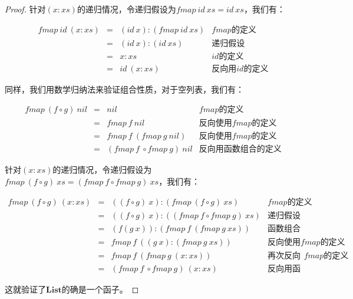 \documentclass{article}
\begin{document}
\begin{example}
\begin{proof}
针对$(x:xs)$的递归情况，令递归假设为$fmap\ id\ xs = id\ xs$，我们有：

\[
\begin{array}{rcll}
fmap\ id\ (x:xs) & = & (id\ x):(fmap\ id\ xs) & \text{$fmap$的定义} \\
                 & = & (id\ x):(id\ xs) & \text{递归假设} \\
                 & = & x:xs & \text{$id$的定义} \\
                 & = & id\ (x:xs) & \text{反向用$id$的定义}
\end{array}
\]

同样，我们用数学归纳法来验证组合性质，对于空列表，我们有：

\[
\begin{array}{rcll}
fmap\ (f \circ g)\ nil & = & nil & \text{$fmap$的定义} \\
           & = & fmap\ f\ nil & \text{反向使用$fmap$的定义} \\
           & = & fmap\ f\ (fmap\ g\ nil) & \text{反向使用$fmap$的定义} \\
           & = & (fmap\ f\ \circ fmap\ g)\ nil & \text{反向用函数组合的定义}
\end{array}
\]

针对$(x:xs)$的递归情况，令递归假设为$fmap\ (f \circ g)\ xs = (fmap\ f \circ fmap\ g)\ xs$，我们有：

\[
\begin{array}{rcll}
fmap\ (f \circ g)\ (x:xs) & = & ((f \circ g)\ x):(fmap\ (f \circ g)\ xs) & \text{$fmap$的定义} \\
  & = & ((f \circ g)\ x):((fmap\ f \circ fmap\ g)\ xs) & \text{递归假设} \\
  & = & (f(g\ x)):(fmap\ f\ (fmap\ g\ xs)) & \text{函数组合的定义} \\
  & = & fmap\ f\ ((g\ x):(fmap\ g\ xs)) & \text{反向使用$fmap$的定义} \\
  & = & fmap\ f\ (fmap\ g\ (x:xs)) & \text{再次反向使用$fmap$的定义} \\
  & = & (fmap\ f\ \circ fmap\ g)\ (x:xs) & \text{反向用函数组合的定义}
\end{array}
\]

这就验证了$\mathbf{List}$的确是一个函子。
\end{proof}
\end{example}

\begin{Exercise}
\end{Exercise}
\end{document}
